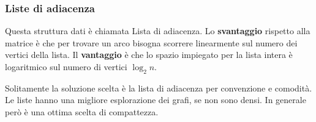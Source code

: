 \subsubsection{Liste di adiacenza}

Questa struttura dati è chiamata Lista di adiacenza. Lo \textbf{svantaggio} rispetto alla matrice è che per trovare un arco bisogna scorrere linearmente sul numero dei vertici della lista.
Il \textbf{vantaggio} è che lo spazio impiegato per la lista intera è logaritmico sul numero di vertici $\log_2 n$.

Solitamente la soluzione scelta è la lista di adiacenza per convenzione e comodità. Le liste hanno una migliore esplorazione dei grafi, se non sono densi. In generale però è una ottima scelta di compattezza.



